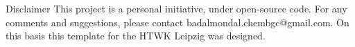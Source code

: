 

\begin{frame}{Disclaimer}
This project is a personal initiative, under open-source code. For any comments and suggestions, please contact badalmondal.chembgc@gmail.com.
On this basis this template for the HTWK Leipzig was designed.
\end{frame}
